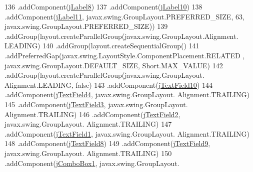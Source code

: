 \begin{DoxyCode}
136                                     .addComponent(\mbox{\hyperlink{class_interfaz_package_1_1_alta_libro_texto_a6af032fd25dc61f681ff44cc8e561afe}{jLabel8}})
137                                     .addComponent(\mbox{\hyperlink{class_interfaz_package_1_1_alta_libro_texto_a7a931dd787f522e40bea361927d6bd1b}{jLabel10}})
138                                     .addComponent(\mbox{\hyperlink{class_interfaz_package_1_1_alta_libro_texto_a162463c516b899f292e7b5b96e2daeb2}{jLabel11}}, javax.swing.GroupLayout.PREFERRED\_SIZE,
       63, javax.swing.GroupLayout.PREFERRED\_SIZE))
139                                 .addGroup(layout.createParallelGroup(javax.swing.GroupLayout.Alignment.
      LEADING)
140                                     .addGroup(layout.createSequentialGroup()
141                                         .addPreferredGap(javax.swing.LayoutStyle.ComponentPlacement.RELATED
      , javax.swing.GroupLayout.DEFAULT\_SIZE, Short.MAX\_VALUE)
142                                         .addGroup(layout.createParallelGroup(javax.swing.GroupLayout.
      Alignment.LEADING, \textcolor{keyword}{false})
143                                             .addComponent(\mbox{\hyperlink{class_interfaz_package_1_1_alta_libro_texto_ac8b1eeb9a66899467821be3b3a5b08f4}{jTextField10}})
144                                             .addComponent(\mbox{\hyperlink{class_interfaz_package_1_1_alta_libro_texto_ac1148593c3d9a5aab2b7133128c72cc3}{jTextField4}}, javax.swing.GroupLayout.
      Alignment.TRAILING)
145                                             .addComponent(\mbox{\hyperlink{class_interfaz_package_1_1_alta_libro_texto_ac608b783532f41462f25b74539afaece}{jTextField3}}, javax.swing.GroupLayout.
      Alignment.TRAILING)
146                                             .addComponent(\mbox{\hyperlink{class_interfaz_package_1_1_alta_libro_texto_ae43d7202d0822d35d7b160c6596351e6}{jTextField2}}, javax.swing.GroupLayout.
      Alignment.TRAILING)
147                                             .addComponent(\mbox{\hyperlink{class_interfaz_package_1_1_alta_libro_texto_ad2e5ab6c5fe3388ffe5a1856c21c3bf0}{jTextField1}}, javax.swing.GroupLayout.
      Alignment.TRAILING)
148                                             .addComponent(\mbox{\hyperlink{class_interfaz_package_1_1_alta_libro_texto_a2d1f30b1c7ece5ce2c890c5595ecdbc7}{jTextField8}})
149                                             .addComponent(\mbox{\hyperlink{class_interfaz_package_1_1_alta_libro_texto_a089a5e28cbdf761694e6edd1136f8630}{jTextField9}}, javax.swing.GroupLayout.
      Alignment.TRAILING)
150                                             .addComponent(\mbox{\hyperlink{class_interfaz_package_1_1_alta_libro_texto_a3413630b2b16f449c4ea9455da599211}{jComboBox1}}, javax.swing.GroupLayout.

\end{DoxyCode}

